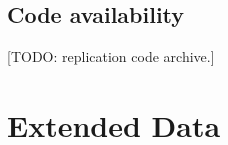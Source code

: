 \documentclass[12pt]{extarticle}
\begin{document}
\subsection*{Code availability}
[TODO: replication code archive.]

\clearpage
\section*{Extended Data}
\setcounter{table}{0}\setcounter{figure}{0}
\renewcommand{\tablename}{Extended Data Table}
\renewcommand{\figurename}{Extended Data Fig.}
\end{document}
